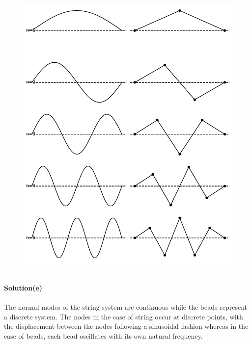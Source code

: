 \documentclass[12pt,a4paper]{article}
\begin{document}
\begin{figure}[h]
    \centering
    \includegraphics[width=0.9\linewidth]{figs/fig_sol_4.6d.pdf}
\end{figure}
\\
\textbf{Solution(e)}
\\
\\The normal modes of the string system are continuous while the beads represent a discrete system. The nodes in the case of string occur at discrete points, with the displacement between the nodes following a sinusoidal fashion whereas in the case of beads, each bead oscillates with its own natural frequency.
\end{document}
